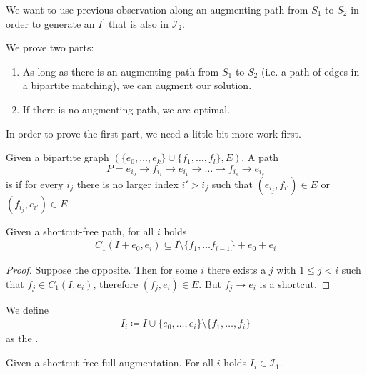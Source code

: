 We want to use previous observation along an augmenting path from $S_1$ to $S_2$
in order to generate an $I^\prime$ that is also in $\mathcal I_2$.
\begin{theorem} \label{thm:augm_path}
    We prove two parts:
    \begin{enumerate}
        \item As long as there is an augmenting path from $S_1$ to $S_2$ (i.e. a path of edges in a bipartite matching),
              we can augment our solution. \label{enum:augm_path}
        \item If there is no augmenting path, we are optimal. \label{enum:opt_path}
    \end{enumerate}
\end{theorem}
In order to prove the first part, we need a little bit more work first.
\begin{definition}
    Given a bipartite graph $(\{e_0,\dots,e_k\} \cup \{f_1,\dots,f_l\}, E)$.
    A path
    \[
        P = e_{i_0} \rightarrow f_{i_1} \rightarrow e_{i_1} \rightarrow \dots \rightarrow f_{i_s} \rightarrow e_{i_s}
    \]
    is  if for every $i_j$ there is no larger index $i'>i_j$ such that $(e_{i_j},f_{i'}) \in E$
    or  $(f_{i_j},e_{i'}) \in E$.
\end{definition}
\begin{lemma}\label{thm:circuit-helper}
    Given a shortcut-free path, for all $i$ holds
    \begin{align*}
        C_1(I + e_0, e_i)\subseteq I \setminus \{f_1, \dots f_{i-1}\}+e_0+e_i
    \end{align*}
\end{lemma}
\begin{proof}
    Suppose the opposite. Then for some $i$ there exists a $j$ with $1 \leq j < i$ such that
    $f_j \in C_1(I,e_i)$, therefore $(f_j, e_i) \in E$. But $f_j \rightarrow e_i$ is a shortcut.
\end{proof}
\begin{definition}
    We define
    \begin{align*}
        I_i \coloneqq I \cup \{e_0, \dots, e_i\} \setminus \{f_1, \dots, f_i\}
    \end{align*}
    as the .
\end{definition}
\begin{lemma} \label{thm:part_augm}
    Given a shortcut-free full augmentation. For all $i$ holds $I_i \in \mathcal I_1$.
\end{lemma}
